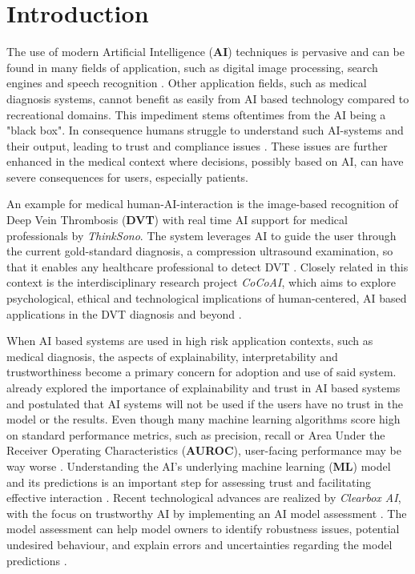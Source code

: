\documentclass[11pt,a4paper,english]{scrreprt}
\begin{document}

\setlength{\parindent}{0em}
\setlength{\parskip}{1em}


\tableofcontents

\newpage
{}
\chapter{Introduction}\label{chapter:introduction}
The use of modern Artificial Intelligence (\textbf{AI}) techniques is pervasive and can be found in many fields of application, such as digital image processing, search engines and speech recognition \parencite{eu_com_ai}. Other application fields, such as medical diagnosis systems, cannot benefit as easily from AI based technology compared to recreational domains. This impediment stems oftentimes from the AI being a "black box". In consequence humans struggle to understand such AI-systems and their output, leading to trust and compliance issues \parencite{adadi_blackbox_2018}. These issues are further enhanced in the medical context where decisions, possibly based on AI, can have severe consequences for users, especially patients.

An example for medical human-AI-interaction is the image-based recognition of Deep Vein Thrombosis (\textbf{DVT}) with real time AI support for medical professionals by \textit{Think\-Sono}. The system leverages AI to guide the user through the current gold-standard diagnosis, a compression ultrasound examination, so that it enables any healthcare professional to detect DVT \parencite{thinksono_website}. Closely related in this context is the interdisciplinary research project \textit{CoCoAI}, which aims to explore psychological, ethical and technological implications of human-centered, AI based applications in the DVT diagnosis and beyond \parencite{cocoai_website}. 

When AI based systems are used in high risk application contexts, such as medical diagnosis, the aspects of explainability, interpretability and trustworthiness become a primary concern for adoption and use of said system. \textcite{ribeiro_why_2016} already explored the importance of explainability and trust in AI based systems and postulated that AI systems will not be used if the users have no trust in the model or the results. Even though many machine learning algorithms score high on standard performance metrics, such as precision, recall or Area Under the Receiver Operating Characteristics (\textbf{AUROC}), user-facing performance may be way worse \parencite{gordon_disagreement_2021}. Understanding the AI's underlying machine learning (\textbf{ML}) model and its predictions is an important step for assessing trust and facilitating effective interaction \parencite{ribeiro_why_2016}. Recent technological advances are realized by \textit{Clearbox AI}, with the focus on trustworthy AI by implementing an AI model assessment \parencite{clearbox_website, eu_trustworthy_ai}. The model assessment can help model owners to identify robustness issues, potential undesired behaviour, and explain errors and uncertainties regarding the model predictions \parencite{clearbox_wp}.
\end{document}
